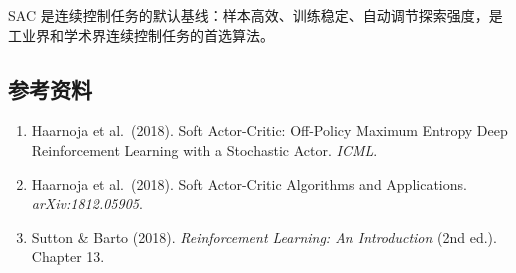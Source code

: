 \documentclass{article}
\begin{document}
SAC 是连续控制任务的默认基线：样本高效、训练稳定、自动调节探索强度，是工业界和学术界连续控制任务的首选算法。

\subsection*{参考资料}

\begin{enumerate}
  \item Haarnoja et al.\ (2018). Soft Actor-Critic: Off-Policy Maximum Entropy Deep Reinforcement Learning with a Stochastic Actor. \textit{ICML}.
  \item Haarnoja et al.\ (2018). Soft Actor-Critic Algorithms and Applications. \textit{arXiv:1812.05905}.
  \item Sutton \& Barto (2018). \textit{Reinforcement Learning: An Introduction} (2nd ed.). Chapter 13.
\end{enumerate}
\end{document}
